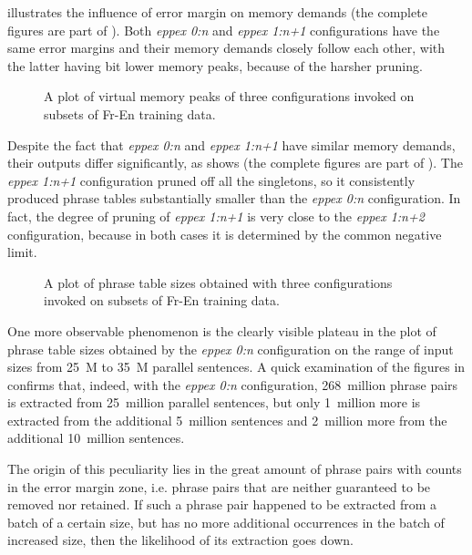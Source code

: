  illustrates the influence of error margin on \eppex{} memory demands
(the complete figures are part of ).
Both \emph{eppex 0:n} and \emph{eppex 1:n+1} configurations have the same error margins and
their memory demands closely follow each other, with the latter having bit lower memory
peaks, because of the harsher pruning.

\begin{figure}[!htb]
  \centering
  
  \caption{
    A plot of virtual memory peaks of three \eppex{} configurations invoked on subsets of Fr-En training data.
  }
  \label{fig:fr-en-vm-peaks}
\end{figure}

Despite the fact that \emph{eppex 0:n} and \emph{eppex 1:n+1} have similar memory demands, their outputs
differ significantly, as  shows (the complete figures are part
of ).
The \emph{eppex 1:n+1} configuration pruned off all the singletons, so it consistently
produced phrase tables substantially smaller than the \emph{eppex 0:n} configuration.
In fact, the degree of pruning of \emph{eppex 1:n+1} is very close to the \emph{eppex 1:n+2} configuration,
because in both cases it is determined by the common negative limit.

\begin{figure}[!htb]
  \centering
  
  \caption{
    A plot of phrase table sizes obtained with three \eppex{} configurations invoked on subsets of Fr-En training data.
  }
  \label{fig:fr-en-phrase-table-sizes}
\end{figure}

One more observable phenomenon is the clearly visible plateau in the plot of phrase table sizes
obtained by the \emph{eppex 0:n} configuration on the range of input sizes from 25~M to 35~M parallel sentences.
A quick examination of the figures in  confirms that, indeed, with
the \emph{eppex 0:n} configuration, 268~million phrase pairs is extracted from 25~million parallel sentences,
but only 1~million more is extracted from the additional 5~million sentences and 2~million more from the additional
10~million sentences.

The origin of this peculiarity lies in the great amount of phrase pairs with counts in the error
margin zone, i.e. phrase pairs that are neither guaranteed to be removed nor retained.
If such a phrase pair happened to be extracted from a batch of a certain size, but has no more
additional occurrences in the batch of increased size, then the likelihood of its extraction
goes down.

